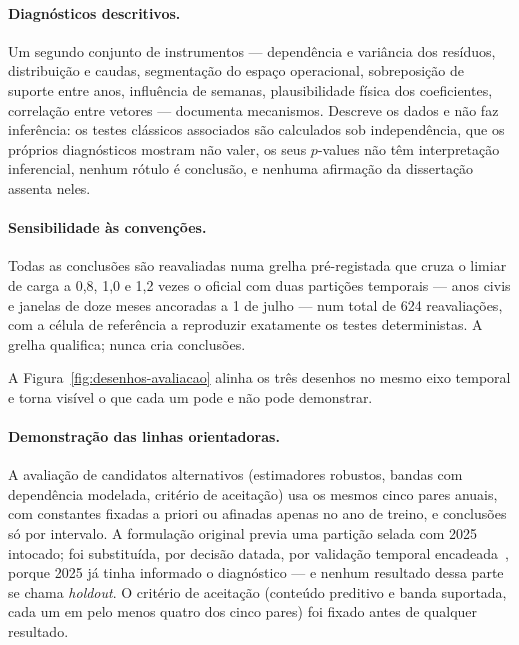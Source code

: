\paragraph{Diagnósticos descritivos.} Um segundo conjunto de instrumentos
--- dependência e variância dos resíduos, distribuição e caudas,
segmentação do espaço operacional, sobreposição de suporte entre anos,
influência de semanas, plausibilidade física dos coeficientes, correlação
entre vetores --- documenta mecanismos. Descreve os dados e não faz
inferência: os testes clássicos associados são calculados sob independência,
que os próprios diagnósticos mostram não valer, os seus $p$-values não têm
interpretação inferencial, nenhum rótulo é conclusão, e nenhuma afirmação da
dissertação assenta neles.

\paragraph{Sensibilidade às convenções.} Todas as conclusões são
reavaliadas numa grelha pré-registada que cruza o limiar de carga a 0,8,
1,0 e 1,2 vezes o oficial com duas partições temporais --- anos civis e
janelas de doze meses ancoradas a 1 de julho --- num total de 624
reavaliações, com a célula de referência a reproduzir exatamente os testes
deterministas. A grelha qualifica; nunca cria conclusões.

A Figura~\ref{fig:desenhos-avaliacao} alinha os três desenhos no mesmo eixo temporal e torna visível o que cada um pode e não pode demonstrar.


\paragraph{Demonstração das linhas orientadoras.} A avaliação de
candidatos alternativos (estimadores robustos, bandas com dependência
modelada, critério de aceitação) usa os mesmos cinco pares anuais, com
constantes fixadas a priori ou afinadas apenas no ano de treino, e
conclusões só por intervalo. A formulação original previa uma partição
selada com 2025 intocado; foi substituída, por decisão datada, por
validação temporal encadeada~\cite{Tashman2000,BergmeirHyndmanKoo2018},
porque 2025 já tinha informado o diagnóstico --- e nenhum resultado dessa parte se chama \emph{holdout}. O
critério de aceitação (conteúdo preditivo e banda suportada, cada um em
pelo menos quatro dos cinco pares) foi fixado antes de qualquer resultado.

